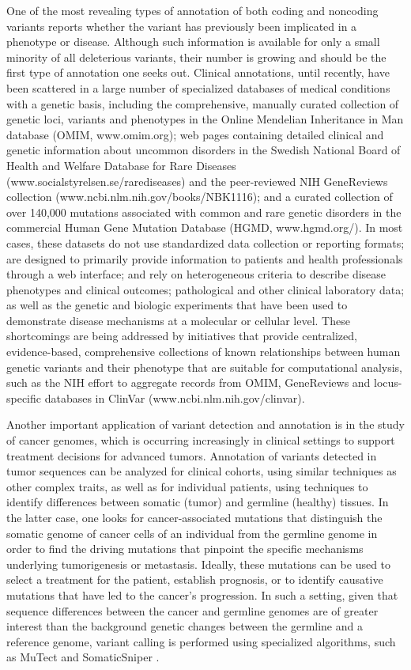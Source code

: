 One of the most revealing types of annotation of both coding and noncoding variants reports whether the variant has previously been implicated in a phenotype or disease. Although such information is available for only a small minority of all deleterious variants, their number is growing and should be the first type of annotation one seeks out. Clinical annotations, until recently, have been scattered in a large number of specialized databases of medical conditions with a genetic basis, including the comprehensive, manually curated collection of genetic loci, variants and phenotypes in the Online Mendelian Inheritance in Man database (OMIM, www.omim.org); web pages containing detailed clinical and genetic information about uncommon disorders in the Swedish National Board of Health and Welfare Database for Rare Diseases (www.socialstyrelsen.se/rarediseases) and the peer-reviewed NIH GeneReviews collection \cite{bryne2008jaspar} (www.ncbi.nlm.nih.gov/books/NBK1116); and a curated collection of over 140,000 mutations associated with common and rare genetic disorders in the commercial Human Gene Mutation Database (HGMD, www.hgmd.org/). In most cases, these datasets do not use standardized data collection or reporting formats; are designed to primarily provide information to patients and health professionals through a web interface; and rely on heterogeneous criteria to describe disease phenotypes and clinical outcomes; pathological and other clinical laboratory data; as well as the genetic and biologic experiments that have been used to demonstrate disease mechanisms at a molecular or cellular level. These shortcomings are being addressed by initiatives that provide centralized, evidence-based, comprehensive collections of known relationships between human genetic variants and their phenotype that are suitable for computational analysis, such as the NIH effort to aggregate records from OMIM, GeneReviews and locus-specific databases in ClinVar (www.ncbi.nlm.nih.gov/clinvar). 

Another important application of variant detection and annotation is in the study of cancer genomes, which is occurring increasingly in clinical settings to support treatment decisions for advanced tumors. Annotation of variants detected in tumor sequences can be analyzed for clinical cohorts, using similar techniques as other complex traits, as well as for individual patients, using techniques to identify differences between somatic (tumor) and germline (healthy) tissues. In the latter case, one looks for cancer-associated mutations that distinguish the somatic genome of cancer cells of an individual from the germline genome in order to find the driving mutations that pinpoint the specific mechanisms underlying tumorigenesis or metastasis. Ideally, these mutations can be used to select a treatment for the patient, establish prognosis, or to identify causative mutations that have led to the cancer's progression. In such a setting, given that sequence differences between the cancer and germline genomes are of greater interest than the background genetic changes between the germline and a reference genome, variant calling is performed using specialized algorithms, such as MuTect  \cite{cibulskis2013sensitive} and SomaticSniper  \cite{larson2012somaticsniper}.

